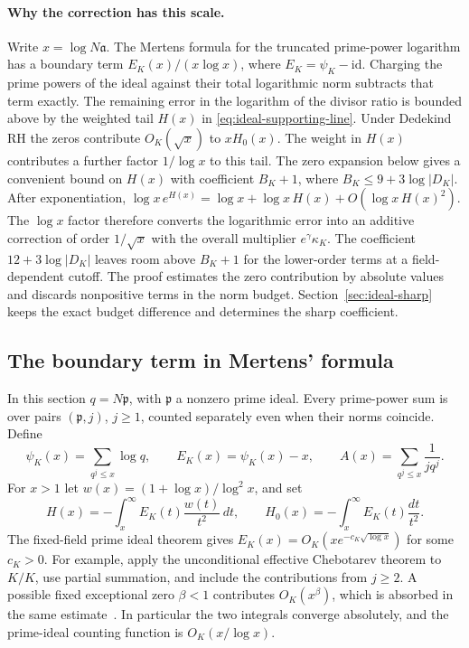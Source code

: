 \documentclass[11pt]{amsart}
\theoremstyle{definition}
\theoremstyle{remark}
\numberwithin{equation}{section}
\begin{document}
\paragraph{Why the correction has this scale.}
Write \(x=\log N\mathfrak a\). The Mertens formula for the
truncated prime-power logarithm has a boundary term
\(E_K(x)/(x\log x)\), where \(E_K=\psi_K-\mathrm{id}\).
Charging the prime powers of the ideal against their total
logarithmic norm subtracts that term exactly. The remaining
error in the logarithm of the divisor ratio is bounded above
by the weighted tail \(H(x)\) in
\eqref{eq:ideal-supporting-line}.
Under Dedekind RH the zeros contribute \(O_K(\sqrt{x})\)
to \(xH_0(x)\). The weight in \(H(x)\) contributes
a further factor \(1/\log x\) to this tail. The zero expansion below
gives a convenient bound on \(H(x)\) with coefficient \(B_K+1\),
where \(B_K\le9+3\log|D_K|\).
After exponentiation,
\(\log x\,e^{H(x)}=\log x+\log x\,H(x)+O(\log x\,H(x)^2)\).
The \(\log x\) factor therefore converts the logarithmic error
into an additive correction of order \(1/\sqrt{x}\) with the
overall multiplier \(e^\gamma\kappa_K\).
The coefficient \(12+3\log|D_K|\) leaves room above
\(B_K+1\) for the lower-order terms at a field-dependent
cutoff. The proof estimates the zero contribution by absolute
values and discards nonpositive terms in the norm budget.
Section~\ref{sec:ideal-sharp} keeps the exact budget difference
and determines the sharp coefficient.

\subsection{The boundary term in Mertens' formula}

In this section \(q=N\mathfrak p\), with \(\mathfrak p\) a nonzero
prime ideal. Every prime-power sum is over pairs
\((\mathfrak p,j)\), \(j\geq1\), counted separately even when their
norms coincide. Define
\[
 \psi_K(x)=\sum_{q^j\leq x}\log q,\qquad
 E_K(x)=\psi_K(x)-x,\qquad
 A(x)=\sum_{q^j\leq x}\frac{1}{jq^j}.
\]
For \(x>1\) let \(w(x)=(1+\log x)/\log^2 x\), and set
\[
 H(x)=-\int_x^\infty E_K(t)\frac{w(t)}{t^2}\,dt,\qquad
 H_0(x)=-\int_x^\infty E_K(t)\frac{dt}{t^2}.
\]
The fixed-field prime ideal theorem gives
\(E_K(x)=O_K(xe^{-c_K\sqrt{\log x}})\) for some \(c_K>0\).
For example, apply the unconditional effective Chebotarev theorem
to \(K/K\), use partial summation, and include the contributions
from \(j\geq2\). A possible fixed exceptional zero \(\beta<1\)
contributes \(O_K(x^\beta)\), which is absorbed in the same
estimate~\cite{LagariasOdlyzko1977}. In particular the two integrals
converge absolutely, and the prime-ideal counting function is
\(O_K(x/\log x)\).
\end{document}
